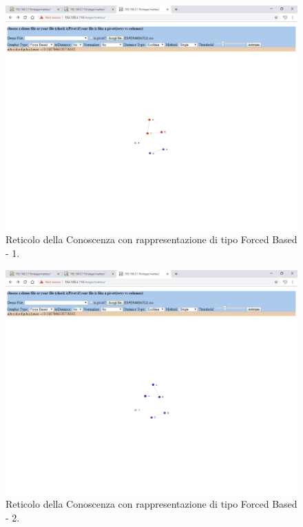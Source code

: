 \noindent
\begin{figure}[H]
\centering
	\includegraphics[width=1\linewidth]{./image/reticoloNonCorretto5.png}
	\caption{Reticolo della Conoscenza con rappresentazione di tipo Forced Based - 1.}
	\label{Reticolo della Conoscenza con rappresentazione di tipo Forced Based - 1.}
\end{figure}
\noindent
\begin{figure}[H]
\centering
	\includegraphics[width=1\linewidth]{./image/reticoloNonCorretto6.png}
	\caption{Reticolo della Conoscenza con rappresentazione di tipo Forced Based - 2.}
	\label{Reticolo della Conoscenza con rappresentazione di tipo Forced Based - 2.}
\end{figure}
